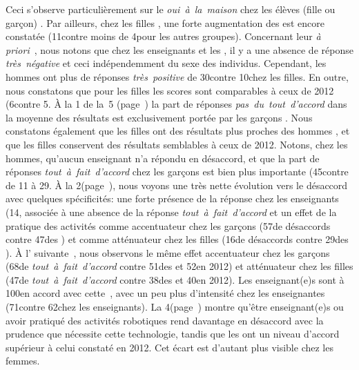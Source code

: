             Ceci s'observe particulièrement sur le \textit{oui~à~la~maison} chez les élèves (fille ou garçon) .
            Par ailleurs, chez les filles , une forte augmentation des  est encore constatée (11\prc contre moins de 4\prc pour les autres groupes).
            Concernant leur \textit{à priori}~, nous notons que chez les enseignants et les , il y a une absence de réponse \textit{très~négative} et ceci indépendemment du sexe des individus.
            Cependant, les hommes ont plus de réponses \textit{très~positive} de 30\prc contre 10\prc chez les filles. 
            En outre, nous constatons que pour les filles  les scores sont comparables à ceux de 2012 (6\prc contre 5\prc[)].
            À la 1\iere {} de la~5 ({\footnotesize page~\pageref{QA5-1}}) la part de réponses \textit{pas~du~tout~d'accord} dans la moyenne des résultats est exclusivement portée par les garçons .
            Nous constatons également que les filles  ont des résultats plus proches des hommes , et que les filles  conservent des résultats semblables à ceux de 2012. 
            Notons, chez les hommes, qu'aucun enseignant n'a répondu en désaccord, et que la part de réponses \textit{tout~à~fait~d'accord} chez les garçons  est bien plus importante (45\prc contre de 11 à 29\prc[)].
            À la 2\ieme {}({\footnotesize page~\pageref{QA5-2}}), nous voyons une très nette évolution vers le désaccord avec quelques spécificités: une forte présence de la réponse  chez les enseignants (14\prc[)], associée à une absence de la réponse \textit{tout~à~fait~d'accord} et un effet de la pratique des activités comme accentuateur chez les garçons (57\prc de désaccords contre 47\prc des ) et comme atténuateur chez les filles (16\prc de désaccords contre 29\prc des ).
            À l'  suivante~, nous observons le même effet accentuateur chez les garçons (68\prc de \textit{tout~à~fait~d'accord} contre 51\prc des  et 52\prc en 2012) et atténuateur chez les filles (47\prc de \textit{tout~à~fait~d'accord} contre 38\prc des  et 40\prc en 2012).
            Les enseignant(e)s sont à 100\prc en accord avec cette~, avec un peu plus d'intensité chez les enseignantes (71\prc contre 62\prc chez les enseignants).
            La 4\ieme {}({\footnotesize page~\pageref{QA5-4}}) montre qu'être enseignant(e)s ou avoir pratiqué des activités robotiques rend davantage en désaccord avec la prudence que nécessite cette technologie, tandis que les  ont un niveau d'accord supérieur à celui constaté en 2012. Cet écart est d'autant plus visible chez les femmes.

